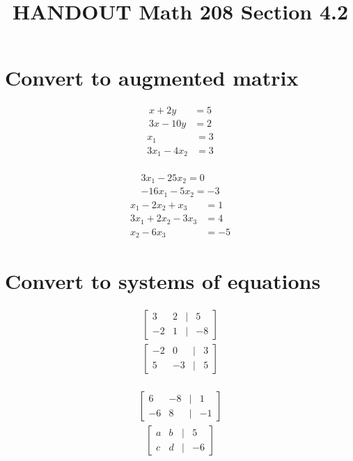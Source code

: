 \documentclass[14pt]{extarticle}
\title{\vspace{-5ex}HANDOUT Math 208 Section 4.2}
\date{\vspace{-10ex}}
\begin{document}
\maketitle		
\section*{Convert to augmented matrix}
\begin{multicols}{2}
\begin{align*}
	x+2y &= 5\\
	3x - 10y &=2	
\end{align*}
\begin{align*}
	x_1 &=3 \\
	3x_1 -4x_2 &= 3
\end{align*}
\\
\begin{align*}
	3x_1 -25x_2 = 0 \\
	-16x_1 - 5x_2 =-3
\end{align*}
\begin{align*}
	x_1 -2x_2 +x_3 &=1 \\
	3x_1 +2x_2 - 3x_3 &=4 \\
	x_2 - 6x_3 &= -5
\end{align*}
\end{multicols}


\section*{Convert to systems of equations}
\begin{multicols}{2}
\begin{align*}
	\begin{bmatrix}
		3 & 2 & | & 5 \\
		-2 & 1 & | & -8
	\end{bmatrix}
\end{align*}
\begin{align*}
	\begin{bmatrix}
		-2 & 0 & | & 3 \\
		5 & -3 & | & 5
	\end{bmatrix}
\end{align*}
\\
\begin{align*}
	\begin{bmatrix}
		6 & -8 & | & 1 \\
		-6 & 8 & | & -1
	\end{bmatrix}
\end{align*}
\begin{align*}
	\begin{bmatrix}
		a & b & | & 5 \\
		c & d & | & -6
	\end{bmatrix}
\end{align*}
\end{multicols}
\end{document}
